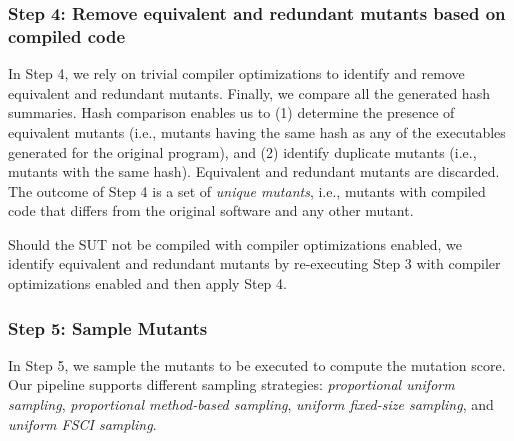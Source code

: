  

\subsubsection{Step 4: Remove equivalent and redundant mutants based on compiled code}

In Step 4, we rely on trivial compiler optimizations to identify and remove equivalent and redundant mutants. 
 Finally, we compare all the generated hash summaries. Hash comparison enables us to (1) determine the presence of equivalent mutants (i.e., mutants having the same hash as any of the executables generated for the original program), and (2) identify duplicate mutants (i.e., mutants with the same hash). %
Equivalent and redundant mutants are discarded.
The outcome of Step 4 is a set of \emph{unique mutants}, i.e., mutants with compiled code that differs from the original software and any other mutant.

Should the SUT not be compiled with compiler optimizations enabled, we identify equivalent and redundant mutants by re-executing Step 3 with compiler optimizations enabled and then apply Step 4.

\subsubsection{Step 5: Sample Mutants}
\label{sec:codeDriven:samplingStep}
\STARTCHANGEDNOV

In Step 5, we sample the mutants to be executed to compute the mutation score. 
Our pipeline supports different sampling strategies: \emph{proportional uniform sampling}, \emph{proportional method-based sampling},  \emph{uniform fixed-size sampling}, and \emph{uniform FSCI sampling}. 

